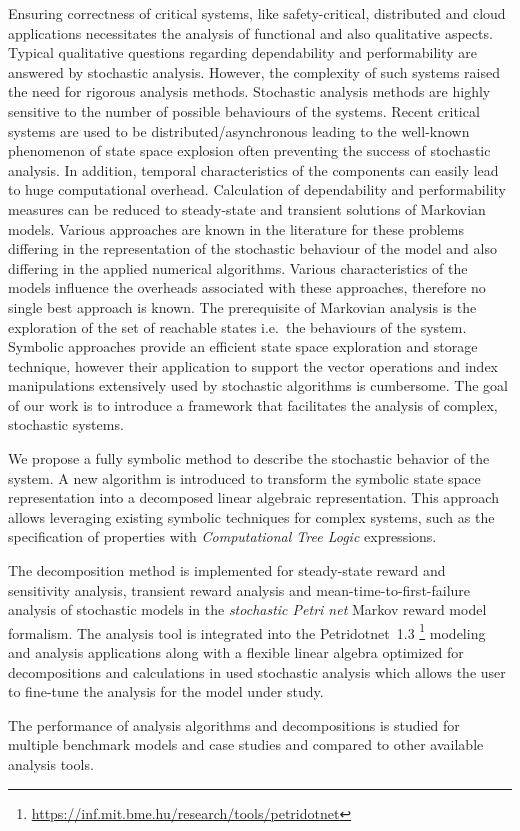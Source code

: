 Ensuring correctness of critical systems, like safety-critical, distributed and cloud applications necessitates the analysis of functional and also qualitative aspects. Typical qualitative questions regarding dependability and performability are answered by stochastic analysis. However, the complexity of such systems raised the need for rigorous analysis methods. 
Stochastic analysis methods are highly sensitive to the number of possible behaviours of the systems. Recent critical systems are used to be distributed/asynchronous leading to the well-known phenomenon of state space explosion often preventing the success of stochastic analysis. In addition, temporal characteristics of the components can easily lead to huge 
computational overhead. 
Calculation of dependability and performability measures can be reduced to steady-state and transient solutions of Markovian models. Various approaches are known in the literature for these problems differing in the representation of the stochastic behaviour of the model and also differing in the applied numerical algorithms. Various characteristics of the models influence the overheads associated with these approaches, therefore no single best approach is known.
The prerequisite of Markovian analysis is the exploration of the set of reachable states i.e.~the behaviours of the system. Symbolic approaches provide an efficient state space exploration and storage technique, however their application to support the vector operations and index manipulations extensively used by stochastic algorithms is cumbersome. 
The goal of our work is to introduce a framework that facilitates the analysis of complex, stochastic systems. 

We propose a fully symbolic method to describe the
stochastic behavior of the system. A new algorithm is introduced to transform the symbolic state space representation into a decomposed linear algebraic representation. This approach allows leveraging existing symbolic
techniques for complex systems, such as the
specification of properties with
\emph{Computational Tree Logic}  expressions.


The decomposition method is implemented for steady-state reward and
sensitivity analysis, transient reward analysis and
mean-time-to-first-failure analysis of stochastic models in the
\emph{stochastic Petri net}  Markov reward model
formalism. The analysis tool is integrated into the Petridotnet~1.3%
\footnote{\url{https://inf.mit.bme.hu/research/tools/petridotnet}}
modeling and analysis applications along with a flexible linear
algebra optimized for decompositions and calculations in used
stochastic analysis which allows the user to fine-tune the analysis
for the model under study.

The performance of analysis algorithms and decompositions is studied
for multiple benchmark models and case studies and compared to other
available analysis tools.
